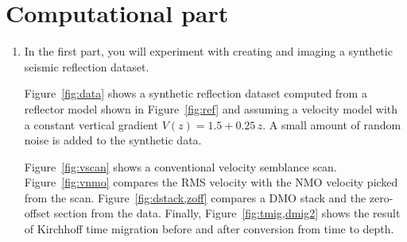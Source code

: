 \section{Computational part}

\begin{enumerate}
\item In the first part, you will experiment with creating and 
  imaging a synthetic seismic reflection dataset.



Figure~\ref{fig:data} shows a synthetic reflection dataset computed
from a reflector model shown in Figure~\ref{fig:ref} and assuming a
velocity model with a constant vertical gradient $V(z) = 1.5 +
0.25\,z$. A small amount of random noise is added to the synthetic data.

Figure~\ref{fig:vscan} shows a conventional velocity semblance
scan. Figure~\ref{fig:vnmo} compares the RMS velocity with the NMO
velocity picked from the scan. Figure~\ref{fig:dstack,zoff} compares a
DMO stack and the zero-offset section from the data. Finally,
Figure~\ref{fig:tmig,dmig2} shows the result of Kirchhoff time
migration before and after conversion from time to depth.


\end{enumerate}
